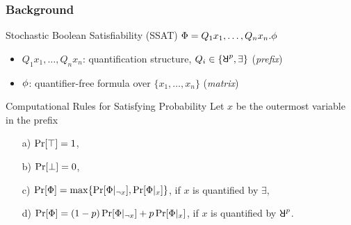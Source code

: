 \begin{frame}
  \frametitle{Background}
  \begin{block}{Stochastic Boolean Satisfiability (SSAT)}
    $\Phi=Q_1 x_1,\ldots,Q_n x_n.\phi$
    \pause
    \begin{itemize}
      \item $Q_1 x_1,\ldots,Q_n x_n$: quantification structure, $Q_i \in \{\random{p},\exists\}$ (\emph{prefix})
            \pause
      \item $\phi$: quantifier-free formula over $\{x_1,\ldots,x_n\}$ (\emph{matrix})
    \end{itemize}
  \end{block}
  \pause
  \begin{block}{Computational Rules for Satisfying Probability}
    Let $x$ be the outermost variable in the prefix
    \pause
    \begin{enumerate}
      \item[a)] $\Pr[\top]=1$,
            \pause
      \item[b)] $\Pr[\bot]=0$,
            \pause
      \item[c)] $\Pr[\Phi]=\max\{\Pr[\Phi|_{\lnot x}],\Pr[\Phi|_{x}]\}$, if $x$ is quantified by $\exists$,
            \pause
      \item[d)] $\Pr[\Phi]=(1-p)\Pr[\Phi|_{\lnot x}]+p\Pr[\Phi|_{x}]$, if $x$ is quantified by $\random{p}$.
    \end{enumerate}
  \end{block}
\end{frame}

